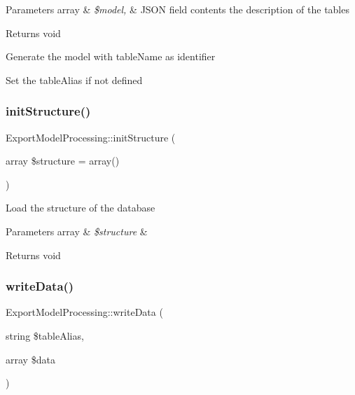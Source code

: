 \begin{DoxyParams}[1]{Parameters}
array & {\em \$model,} & J\+S\+ON field contents the description of the tables \\
\hline
\end{DoxyParams}
\begin{DoxyReturn}{Returns}
void 
\end{DoxyReturn}
Generate the model with table\+Name as identifier

Set the table\+Alias if not defined\mbox{\label{classExportModelProcessing_a2e0ab00ea8525229c72da1abda3d3043}} 
\subsubsection{\texorpdfstring{init\+Structure()}{initStructure()}}
{\footnotesize\ttfamily Export\+Model\+Processing\+::init\+Structure (\begin{DoxyParamCaption}\item[{array}]{\$structure = {\ttfamily array()} }\end{DoxyParamCaption})}

Load the structure of the database


\begin{DoxyParams}[1]{Parameters}
array & {\em \$structure} & \\
\hline
\end{DoxyParams}
\begin{DoxyReturn}{Returns}
void 
\end{DoxyReturn}
\mbox{\label{classExportModelProcessing_a2038baafaded8f112fecf777792a3204}} 
\subsubsection{\texorpdfstring{write\+Data()}{writeData()}}
{\footnotesize\ttfamily Export\+Model\+Processing\+::write\+Data (\begin{DoxyParamCaption}\item[{string}]{\$table\+Alias,  }\item[{array}]{\$data }\end{DoxyParamCaption})}

